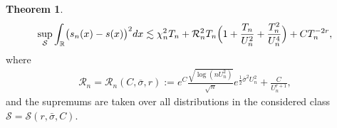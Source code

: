 \documentclass[a4paper,11pt]{article}
\theoremstyle{definition}
\newtheorem{remark}{Remark}
\newcommand{\R}{{\mathbb{R}}}
\newcommand{\1}{\mathbb{I}}
\def\R{\mathbb{R}}
\newcommand{\eps}{\varepsilon}
\newcommand{\e}{e}
\newtheorem{thm}{Theorem}
\theoremstyle{remark}
\begin{document}
\begin{thm}
\begin{eqnarray*}
\sup_{\mathcal{S}} \int_{\R} \bigl( 
s_n(x) - s(x) 
\bigr)^2 dx \lesssim 
\chi_n^2 T_n + \mathcal{R}_n^2  T_n \Bigl( 1+  \frac{T_n}{U_n^2}  + \frac{T_n^2}{U_n^4}\Bigr)
 + C T_n^{-2r},
\end{eqnarray*}
where
\begin{eqnarray*}
\mathcal{R}_n =
\mathcal{R}_n (C, \overline{\sigma},r) := 
\e^{C}
\frac{\sqrt{\log(nU_n^2)}}{\sqrt{n}}
e^{\frac{1}{2}\overline{\sigma}^2U_n^2} +   \frac{C}{U_n^{r + 1}},
\end{eqnarray*}
and the supremums are taken over all distributions in the considered class \(\mathcal{S}=\mathcal{S}(r, \bar{\sigma}, C).\) 
 \end{thm}
% 
\end{document}
